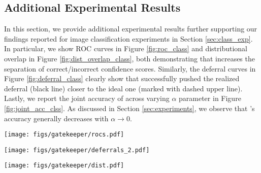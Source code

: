 \subsection{Additional Experimental Results}
\label{app:additional_exp_class}

In this section, we provide additional experimental results further supporting our findings reported for image classification experiments in Section \ref{sec:class_exp}. In particular, we show ROC curves in Figure \ref{fig:roc_class} and distributional overlap in Figure \ref{fig:dist_overlap_class}, both demonstrating that \loss increases the separation of correct/incorrect confidence scores. Similarly, the deferral curves in Figure \ref{fig:deferral_class} clearly show that \loss successfully pushed the realized deferral (black line) closer to the ideal one (marked with dashed upper line). Lastly, we report the joint accuracy of \smallmodel across varying $\alpha$ parameter in Figure \ref{fig:joint_acc_clss}. As discussed in Section \ref{sec:experiments}, we observe that \smallmodel's accuracy generally decreases with $\alpha \rightarrow 0$.


\begin{figure*}[h]
    \centering
    \texttt{[image: figs/gatekeeper/rocs.pdf]}
    \caption[ROC curves for image classification experiments.]{\textbf{ROC curves for image classification experiments}. Each figure shows the ROC curves for each of the datasets considered in Section \ref{sec:class_exp}. We observe that \loss consistently increases separation of correct and incorrect confidence scores across varying $\alpha$ (colored curves) compared to the baseline (denoted with black dashed line).}
    \label{fig:roc_class}
\end{figure*}

\begin{figure*}[h]
    \centering
    \texttt{[image: figs/gatekeeper/deferrals\_2.pdf]}
    \caption[Joint accuracy across different levels of $\alpha$.]{\textbf{Joint accuracy across different levels of $\alpha$}. For varying fixed deferral ratios, we observe that the accuracy of \smallmodel generally decreases as $\alpha \rightarrow 0$.}
    \label{fig:joint_acc_clss}
\end{figure*}
\begin{figure*}[h]
    \centering
    \texttt{[image: figs/gatekeeper/dist.pdf]}
    \caption[Distributional overlap for image classification experiments.]{\textbf{Distributional overlap for image classification experiments}. Left-most column shows the results obtained using the untuned baseline, while the remaining columns correspond to the results obtained using \loss with decreasing $\alpha$ values. Rows correspond to the datasets considered in Section \ref{sec:class_exp}. We see that \loss increases separation of correct and incorrect confidence scores compared to the baseline.}
    \label{fig:dist_overlap_class}
\end{figure*}

